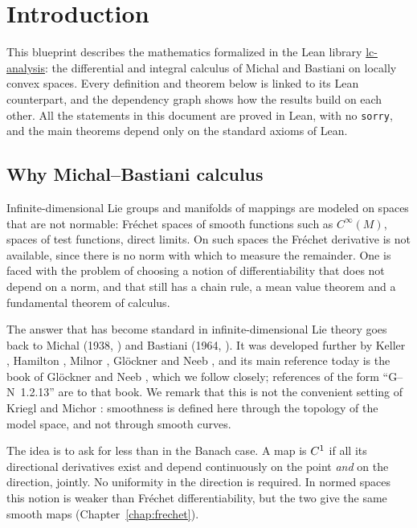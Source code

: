 \chapter{Introduction}
\label{chap:introduction}

This blueprint describes the mathematics formalized in the Lean library
\href{https://github.com/glaroton/lc-analysis}{lc-analysis}: the differential and integral
calculus of Michal and Bastiani on locally convex spaces. Every definition and theorem below is
linked to its Lean counterpart, and the dependency graph shows how the results build on each
other. All the statements in this document are proved in Lean, with no \texttt{sorry}, and the
main theorems depend only on the standard axioms of Lean.

\section*{Why Michal--Bastiani calculus}

Infinite-dimensional Lie groups and manifolds of mappings are modeled on spaces that are not
normable: Fréchet spaces of smooth functions such as $C^\infty(M)$, spaces of test functions,
direct limits. On such spaces the Fréchet derivative is not available, since there is no norm
with which to measure the remainder. One is faced with the problem of choosing a notion of
differentiability that does not depend on a norm, and that still has a chain rule, a mean value
theorem and a fundamental theorem of calculus.

The answer that has become standard in infinite-dimensional Lie theory goes back to Michal
(1938, \cite{Mic38}) and Bastiani (1964, \cite{Bas64}). It was developed further by Keller
\cite{Kel74}, Hamilton \cite{Ham82}, Milnor \cite{Mil84}, Glöckner \cite{Glo02} and Neeb
\cite{Nee06}, and its main reference today is the book of Glöckner and Neeb \cite{GN26}, which
we follow closely; references of the form ``G--N~1.2.13'' are to that book. We remark that this
is not the convenient setting of Kriegl and Michor \cite{KM97}: smoothness is defined here
through the topology of the model space, and not through smooth curves.

The idea is to ask for less than in the Banach case. A map is $C^{1}$ if all its directional
derivatives exist and depend continuously on the point \emph{and} on the direction, jointly. No
uniformity in the direction is required. In normed spaces this notion is weaker than Fréchet
differentiability, but the two give the same smooth maps (Chapter~\ref{chap:frechet}).

